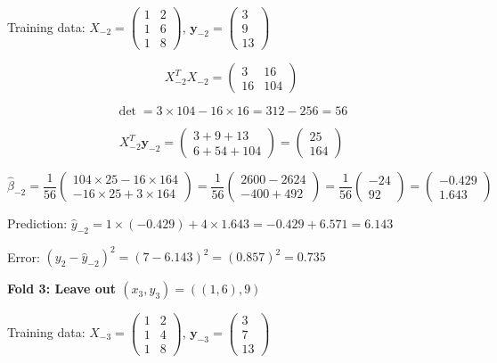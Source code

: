 \documentclass[12pt]{article}
\begin{document}
\begin{solution}
Training data: $X_{-2} = \begin{pmatrix} 1 & 2 \\ 1 & 6 \\ 1 & 8 \end{pmatrix}$, $\mathbf{y}_{-2} = \begin{pmatrix} 3 \\ 9 \\ 13 \end{pmatrix}$

\[X_{-2}^TX_{-2} = \begin{pmatrix} 3 & 16 \\ 16 & 104 \end{pmatrix}\]

\[\det = 3 \times 104 - 16 \times 16 = 312 - 256 = 56\]

\[X_{-2}^T\mathbf{y}_{-2} = \begin{pmatrix} 3 + 9 + 13 \\ 6 + 54 + 104 \end{pmatrix} = \begin{pmatrix} 25 \\ 164 \end{pmatrix}\]

\[\hat{\beta}_{-2} = \frac{1}{56}\begin{pmatrix} 104 \times 25 - 16 \times 164 \\ -16 \times 25 + 3 \times 164 \end{pmatrix} = \frac{1}{56}\begin{pmatrix} 2600 - 2624 \\ -400 + 492 \end{pmatrix} = \frac{1}{56}\begin{pmatrix} -24 \\ 92 \end{pmatrix} = \begin{pmatrix} -0.429 \\ 1.643 \end{pmatrix}\]

Prediction: $\hat{y}_{-2} = 1 \times (-0.429) + 4 \times 1.643 = -0.429 + 6.571 = 6.143$

Error: $(y_2 - \hat{y}_{-2})^2 = (7 - 6.143)^2 = (0.857)^2 = 0.735$

\textbf{Fold 3: Leave out $(x_3, y_3) = ((1,6), 9)$}

Training data: $X_{-3} = \begin{pmatrix} 1 & 2 \\ 1 & 4 \\ 1 & 8 \end{pmatrix}$, $\mathbf{y}_{-3} = \begin{pmatrix} 3 \\ 7 \\ 13 \end{pmatrix}$


\end{solution}
\end{document}
